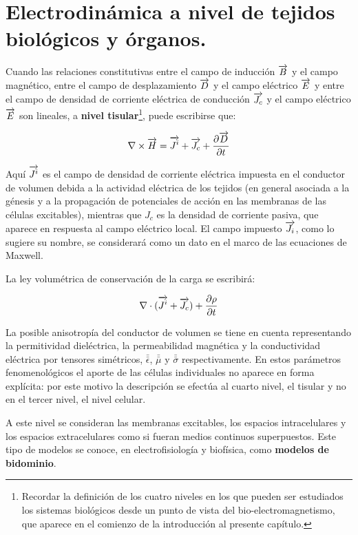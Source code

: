 \section{Electrodinámica a nivel de tejidos biológicos y órganos.}

Cuando las relaciones constitutivas entre el campo de inducción $\overrightarrow{B}$ y el campo magnético, entre el campo de desplazamiento $\overrightarrow{D}$ y el campo eléctrico $\overrightarrow{E}$ y entre el campo de densidad de corriente eléctrica de conducción $\overrightarrow{J_{c}}$ y el campo eléctrico $\overrightarrow{E}$ son lineales, a \textbf{nivel tisular}\footnote{Recordar la definición de los cuatro niveles en los que pueden ser estudiados los sistemas biológicos desde un punto de vista del bio-electromagnetismo, que aparece en el comienzo de la introducción al presente capítulo.}, puede escribirse que:

\begin{equation}
	\nabla \times \overrightarrow{H}= \overrightarrow{J^{i}}+\overrightarrow{J_{c}}+\dfrac{\partial \overrightarrow{D}}{\partial t}
\end{equation}

Aquí $\overrightarrow{J^{i}}$ es el campo de densidad de corriente eléctrica impuesta en el conductor de volumen debida a la actividad eléctrica de los tejidos (en general asociada a la génesis y a la propagación de potenciales de acción en las membranas de las células excitables), mientras que $J_{c}$ es la densidad de corriente pasiva, que aparece en respuesta al campo eléctrico local. El campo impuesto $\overrightarrow{J_{i}}$, como lo sugiere su nombre, se considerará como un dato en el marco de las ecuaciones de Maxwell. 

La ley volumétrica de conservación de la carga se escribirá:

\begin{equation}
	\nabla \cdot (\overrightarrow{J^{i}} + \overrightarrow{J_{c}} ) +  \dfrac{\partial \rho}{\partial t} 
\end{equation}

La posible anisotropía del conductor de volumen se tiene en cuenta representando la permitividad dieléctrica, la permeabilidad magnética y la conductividad eléctrica por tensores simétricos, $\bar{\bar{\epsilon}}$, $\bar{\bar{\mu}}$ y $\bar{\bar{\sigma}}$ respectivamente.
En estos parámetros fenomenológicos el aporte de las células individuales no aparece en forma explícita: por este motivo la descripción se efectúa al cuarto nivel, el tisular y no en el tercer nivel, el nivel celular.

A este nivel se consideran las membranas excitables, los espacios intracelulares y los espacios extracelulares como si fueran medios continuos superpuestos. Este tipo de modelos se conoce, en electrofisiología y biofísica, como \textbf{modelos de bidominio}.


